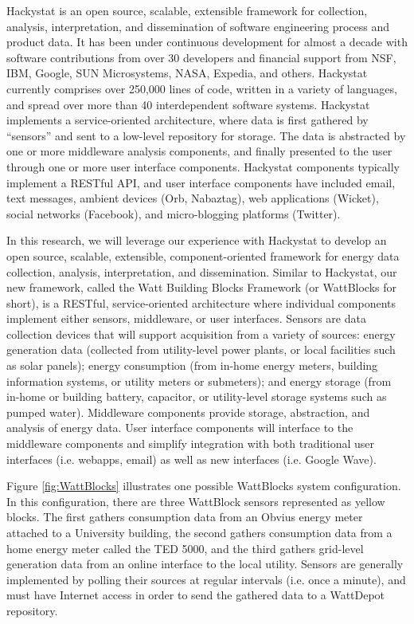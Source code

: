 Hackystat is an open source, scalable, extensible framework for collection,
analysis, interpretation, and dissemination of software engineering process
and product data.  It has been under continuous development for almost a
decade with software contributions from over 30 developers and financial
support from NSF, IBM, Google, SUN Microsystems, NASA, Expedia, and others.  
Hackystat currently comprises over 250,000 lines of code, written
in a variety of languages, and spread over more than 40 interdependent
software systems.  Hackystat implements a service-oriented architecture,
where data is first gathered by ``sensors'' and sent to a low-level
repository for storage.  The data is abstracted by one or more middleware
analysis components, and finally presented to the user through one or more
user interface components.  Hackystat components typically implement a
RESTful API, and user interface components have included email, text
messages, ambient devices (Orb, Nabaztag), web applications (Wicket),
social networks (Facebook), and micro-blogging platforms (Twitter).

In this research, we will leverage our experience with Hackystat to develop
an open source, scalable, extensible, component-oriented framework for
energy data collection, analysis, interpretation, and dissemination.
Similar to Hackystat, our new framework, called the Watt Building Blocks
Framework (or WattBlocks for short), is a RESTful, service-oriented
architecture where individual components implement either sensors,
middleware, or user interfaces.  Sensors are data collection devices that
will support acquisition from a variety of sources: energy generation data
(collected from utility-level power plants, or local facilities such as
solar panels); energy consumption (from in-home energy meters, building
information systems, or utility meters or submeters); and energy storage
(from in-home or building battery, capacitor, or utility-level storage
systems such as pumped water).  Middleware components provide storage,
abstraction, and analysis of energy data. User interface components will
interface to the middleware components and simplify integration with both
traditional user interfaces (i.e. webapps, email) as well as new interfaces
(i.e. Google Wave).

Figure \ref{fig:WattBlocks} illustrates one possible WattBlocks system
configuration.  In this configuration, there are three WattBlock sensors
represented as yellow blocks.  The first gathers consumption data from an
Obvius energy meter attached to a University building, the second gathers
consumption data from a home energy meter called the TED 5000, and the
third gathers grid-level generation data from an online interface to the
local utility.  Sensors are generally implemented by polling their sources
at regular intervals (i.e. once a minute), and must have Internet
access in order to send the gathered data to a WattDepot repository.


